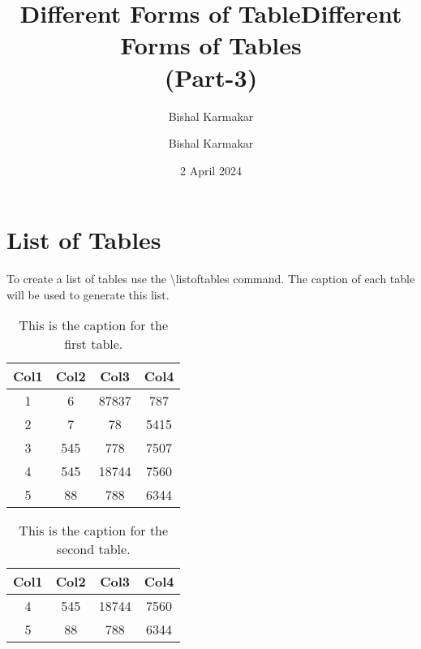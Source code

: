\documentclass{article}
\title{Different Forms of Table} \author{Bishal Karmakar}
\begin{document}
\title{\textbf{Different Forms of Tables}\\\textbf{ (Part-3)}}
\author{Bishal Karmakar}
\date{2 April 2024}
\maketitle
\listoftables{}

\section{List of Tables}
To create a list of tables use the \textbackslash listoftables{} command. The caption of each table will be used to generate this list.

\begin{table}[h!]
\centering
\begin{tabular}{||c c c c||}
\hline

Col1 & Col2 & Col3 & Col4 \\
\hline
\hline
1 & 6 & 87837 & 787 \\
2 & 7 & 78 & 5415 \\
3 & 545 & 778 & 7507 \\
4 & 545 & 18744 & 7560 \\
5 & 88 & 788 & 6344 \\
\hline
\end{tabular}
\caption{This is the caption for the first table.}
\label{tab:sample5}
\end{table}

\begin{table}[h!]
\centering
\begin{tabular}{||c c c c||}
\hline

Col1 & Col2 & Col3 & Col4 \\
\hline
\hline
4 & 545 & 18744 & 7560 \\
5 & 88 & 788 & 6344 \\
\hline
\end{tabular}
\caption{This is the caption for the second table.}
\label{tab:sample5}
\end{table}
\end{document}

